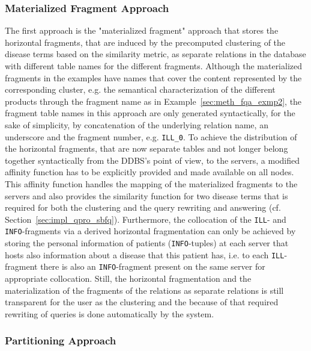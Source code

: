 \subsubsection{Materialized Fragment Approach}
\label{sec:impl_alter_mater}
The first approach is the "materialized fragment" approach that stores the horizontal fragments, that are induced by the precomputed clustering of the disease
terms based on the similarity metric, as separate relations in the database with different table names for the different fragments. Although the materialized
fragments in the examples have names that cover the content represented by the corresponding cluster, e.g. the semantical characterization of the different
products through the fragment name as in Example~\ref{sec:meth_fqa_exmp2}, the fragment table names in this approach are only generated syntactically, for the
sake of simplicity, by concatenation of the underlying relation name, an underscore and the fragment number, e.g. \verb!ILL_0!. To achieve the distribution of
the horizontal fragments, that are now separate tables and not longer belong together syntactically from the DDBS's point of view, to the servers, a modified
affinity function has to be explicitly provided and made available on all nodes. This affinity function handles the mapping of the materialized fragments to 
the servers and also provides the similarity function for two disease terms that is required for both the clustering and the query rewriting and answering 
(cf. Section~\ref{sec:impl_qpro_sbfq}). Furthermore, the collocation of the \verb!ILL!- and \verb!INFO!-fragments via a derived horizontal fragmentation can
only be achieved by storing the personal information of patients (\verb!INFO!-tuples) at each server that hosts also information about a disease that this
patient has, i.e. to each \verb!ILL!-fragment there is also an \verb!INFO!-fragment present on the same server for appropriate collocation. Still, the
horizontal fragmentation and the materialization of the fragments of the relations as separate relations is still transparent for the user as the clustering 
and the because of that required rewriting of queries is done automatically by the system.


\subsubsection{Partitioning Approach}

